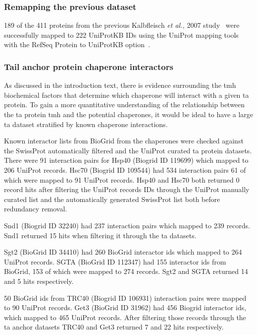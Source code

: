 \subsubsection{Remapping the previous dataset}
189 of the 411 proteins from the previous Kalbfleisch \textit{et al.,} 2007 study~\cite{Kalbfleisch2007} were successfully mapped to 222 UniProtKB IDs using the UniProt mapping tools with the RefSeq Protein to UniProtKB option~\cite{TheUniProtConsortium2014}.

\subsubsection{Tail anchor protein chaperone interactors}
As discussed in the introduction text,  there is evidence surrounding the \gls{tmh} biochemical factors that determine which chaperone will interact with a given \gls{ta} protein.
To gain a more quantitative understanding of the relationship between the \gls{ta} protein \gls{tmh} and the potential chaperones, it would be ideal to have a large \gls{ta} dataset stratified by known chaperone interactions.

Known interactor lists from BioGrid from the chaperones were checked against the SwissProt automatically filtered and the UniProt curated \gls{ta} protein datasets.
There were 91 interaction pairs for Hsp40 (Biogrid ID 119699) which mapped to 206 UniProt records.
Hsc70 (Biogrid ID 109544) had 534 interaction pairs 61 of which were mapped to 91 UniProt records.
Hsp40 and Hsc70 both returned 0 record hits after filtering the UniProt records IDs through the UniProt manually curated list and the automatically generated SwissProt list both before redundancy removal.

Snd1 (Biogrid ID 32240) had 237 interaction pairs which mapped to 239 records.
Snd1 returned 15 hits when filtering it through the \gls{ta} datasets.

Sgt2 (BioGrid ID 34410) had 260 BioGrid interactor ids which mapped to 264 UniProt records.
SGTA (BioGrid ID 112347) had 155 interactor ids from BioGrid, 153 of which were mapped to 274 records.
Sgt2 and SGTA returned 14 and 5 hits respectively.

50 BioGrid ids from TRC40 (Biogrid ID 106931) interaction pairs were mapped to 90 UniProt records.
Get3 (BioGrid ID 31962) had 456 Biogrid interactor ids, which mapped to 465 UniProt records.
After filtering those records through the \gls{ta} anchor datasets TRC40 and Get3 returned 7 and 22 hits respectively.

